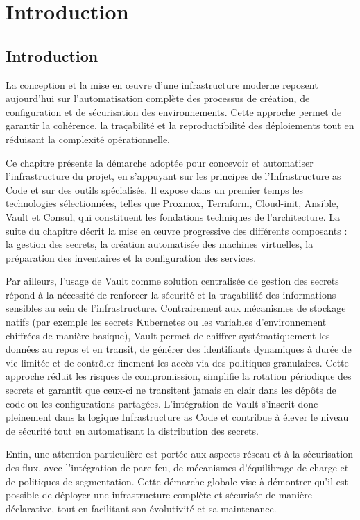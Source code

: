 \section{Introduction}

\subsection{Introduction}

La conception et la mise en œuvre d’une infrastructure moderne reposent aujourd’hui sur l’automatisation complète des processus de création, de configuration et de sécurisation des environnements. Cette approche permet de garantir la cohérence, la traçabilité et la reproductibilité des déploiements tout en réduisant la complexité opérationnelle.

Ce chapitre présente la démarche adoptée pour concevoir et automatiser l’infrastructure du projet, en s’appuyant sur les principes de l’Infrastructure as Code et sur des outils spécialisés. Il expose dans un premier temps les technologies sélectionnées, telles que Proxmox, Terraform, Cloud-init, Ansible, Vault et Consul, qui constituent les fondations techniques de l’architecture. La suite du chapitre décrit la mise en œuvre progressive des différents composants : la gestion des secrets, la création automatisée des machines virtuelles, la préparation des inventaires et la configuration des services.

Par ailleurs, l’usage de Vault comme solution centralisée de gestion des secrets répond à la nécessité de renforcer la sécurité et la traçabilité des informations sensibles au sein de l’infrastructure. Contrairement aux mécanismes de stockage natifs (par exemple les secrets Kubernetes ou les variables d’environnement chiffrées de manière basique), Vault permet de chiffrer systématiquement les données au repos et en transit, de générer des identifiants dynamiques à durée de vie limitée et de contrôler finement les accès via des politiques granulaires. Cette approche réduit les risques de compromission, simplifie la rotation périodique des secrets et garantit que ceux-ci ne transitent jamais en clair dans les dépôts de code ou les configurations partagées. L’intégration de Vault s’inscrit donc pleinement dans la logique Infrastructure as Code et contribue à élever le niveau de sécurité tout en automatisant la distribution des secrets.

Enfin, une attention particulière est portée aux aspects réseau et à la sécurisation des flux, avec l’intégration de pare-feu, de mécanismes d’équilibrage de charge et de politiques de segmentation. Cette démarche globale vise à démontrer qu’il est possible de déployer une infrastructure complète et sécurisée de manière déclarative, tout en facilitant son évolutivité et sa maintenance.
